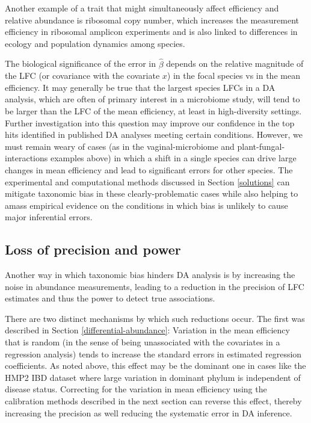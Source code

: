 \documentclass[
]{article}
\begin{document}
Another example of a trait that might simultaneously affect efficiency and relative abundance is ribosomal copy number, which increases the measurement efficiency in ribosomal amplicon experiments and is also linked to differences in ecology and population dynamics among species.

The biological significance of the error in \(\hat \beta\) depends on the relative magnitude of the LFC (or covariance with the covariate \(x\)) in the focal species vs in the mean efficiency.
It may generally be true that the largest species LFCs in a DA analysis, which are often of primary interest in a microbiome study, will tend to be larger than the LFC of the mean efficiency, at least in high-diversity settings.
Further investigation into this question may improve our confidence in the top hits identified in published DA analyses meeting certain conditions.
However, we must remain weary of cases (as in the vaginal-microbiome and plant-fungal-interactions examples above) in which a shift in a single species can drive large changes in mean efficiency and lead to significant errors for other species.
The experimental and computational methods discussed in Section \ref{solutions} can mitigate taxonomic bias in these clearly-problematic cases while also helping to amass empirical evidence on the conditions in which bias is unlikely to cause major inferential errors.

\hypertarget{loss-of-precision-and-power}{%
\subsection{Loss of precision and power}\label{loss-of-precision-and-power}}

Another way in which taxonomic bias hinders DA analysis is by increasing the noise in abundance measurements, leading to a reduction in the precision of LFC estimates and thus the power to detect true associations.

There are two distinct mechanisms by which such reductions occur.
The first was described in Section \ref{differential-abundance}: Variation in the mean efficiency that is random (in the sense of being unassociated with the covariates in a regression analysis) tends to increase the standard errors in estimated regression coefficients.
As noted above, this effect may be the dominant one in cases like the HMP2 IBD dataset where large variation in dominant phylum is independent of disease status.
Correcting for the variation in mean efficiency using the calibration methods described in the next section can reverse this effect, thereby increasing the precision as well reducing the systematic error in DA inference.
\end{document}
